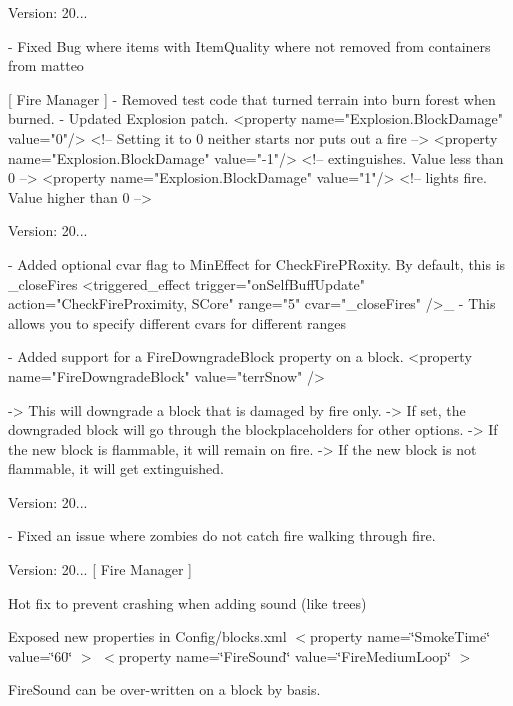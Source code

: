 Version\+: 20... \begin{DoxyVerb}
  - Fixed Bug where items with ItemQuality where not removed from containers from matteo

[ Fire Manager ]
    - Removed test code that turned terrain into burn forest when burned.
    - Updated Explosion patch.
        <property name="Explosion.BlockDamage" value="0"/>  <!-- Setting it to 0 neither starts nor puts out a fire -->
        <property name="Explosion.BlockDamage" value="-1"/>  <!-- extinguishes. Value less than 0 -->
        <property name="Explosion.BlockDamage" value="1"/>  <!-- lights fire. Value higher than 0 -->
\end{DoxyVerb}


Version\+: 20... \begin{DoxyVerb}
    - Added optional cvar flag to MinEffect for CheckFirePRoxity. By default, this is _closeFires
        <triggered_effect trigger="onSelfBuffUpdate" action="CheckFireProximity, SCore" range="5" cvar="_closeFires" />_
    - This allows you to specify different cvars for different ranges

    - Added support for a FireDowngradeBlock property on a block.
        <property name="FireDowngradeBlock" value="terrSnow" />

        -> This will downgrade a block that is damaged by fire only.
        -> If set, the downgraded block will go through the blockplaceholders for other options.
        -> If the new block is flammable, it will remain on fire.
        -> If the new block is not flammable, it will get extinguished.
\end{DoxyVerb}


Version\+: 20... \begin{DoxyVerb}
    - Fixed an issue where zombies do not catch fire walking through fire.
\end{DoxyVerb}


Version\+: 20... \mbox{[} Fire Manager \mbox{]}
\begin{DoxyItemize}
\item Hot fix to prevent crashing when adding sound (like trees)
\item Exposed new properties in Config/blocks.\+xml $<$property name=\char`\"{}\+Smoke\+Time\char`\"{} value=\char`\"{}60\char`\"{} $>$ $<$property name=\char`\"{}\+Fire\+Sound\char`\"{} value=\char`\"{}\+Fire\+Medium\+Loop\char`\"{} $>$
\item Fire\+Sound can be over-\/written on a block by basis. ~\newline

\end{DoxyItemize}


